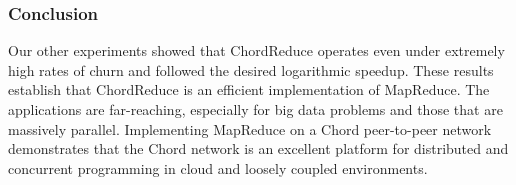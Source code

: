 \documentclass{article}
\begin{document}
\subsubsection*{Conclusion}
Our other experiments showed that ChordReduce operates even under extremely high rates of churn and followed the desired logarithmic speedup.  
These results establish that ChordReduce is an efficient implementation of MapReduce. 
The applications are far-reaching, especially for big data problems and those that are massively parallel. 
Implementing MapReduce on a Chord peer-to-peer network demonstrates that the Chord network is an excellent platform for distributed and concurrent programming in cloud and loosely coupled environments.

{\footnotesize


}
\end{document}
